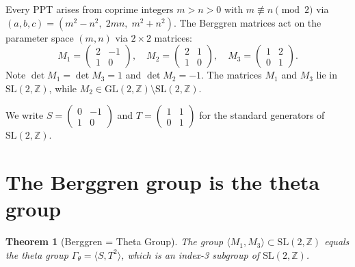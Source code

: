 \documentclass[12pt]{amsart}
\newtheorem{theorem}{Theorem}[section]
\theoremstyle{definition}
\theoremstyle{remark}
\newcommand{\SL}{\mathrm{SL}}
\newcommand{\GL}{\mathrm{GL}}
\newcommand{\Z}{\mathbb{Z}}
\begin{document}
Every PPT arises from coprime integers $m > n > 0$ with $m \not\equiv n
\pmod{2}$ via
$(a,b,c) = (m^2 - n^2,\; 2mn,\; m^2+n^2)$.
The Berggren matrices act on the parameter space $(m,n)$ via $2\times2$
matrices:
\begin{equation}\label{eq:berggren2x2}
M_1 = \begin{pmatrix} 2 & -1\\ 1 & 0\end{pmatrix},\quad
M_2 = \begin{pmatrix} 2 & 1\\ 1 & 0\end{pmatrix},\quad
M_3 = \begin{pmatrix} 1 & 2\\ 0 & 1\end{pmatrix}.
\end{equation}
Note $\det M_1 = \det M_3 = 1$ and $\det M_2 = -1$.
The matrices $M_1$ and $M_3$ lie in $\SL(2,\Z)$, while $M_2 \in
\GL(2,\Z) \setminus \SL(2,\Z)$.

We write $S = \left(\begin{smallmatrix}0&-1\\1&0\end{smallmatrix}\right)$
and $T = \left(\begin{smallmatrix}1&1\\0&1\end{smallmatrix}\right)$ for the
standard generators of $\SL(2,\Z)$.

\section{The Berggren group is the theta group}\label{sec:theta}

\begin{theorem}[Berggren = Theta Group]\label{thm:theta}
The group $\langle M_1, M_3 \rangle \subset \SL(2,\Z)$ equals the
\emph{theta group} $\Gamma_\theta = \langle S, T^2 \rangle$,
which is an index-3 subgroup of\/ $\SL(2,\Z)$.
\end{theorem}
\end{document}
